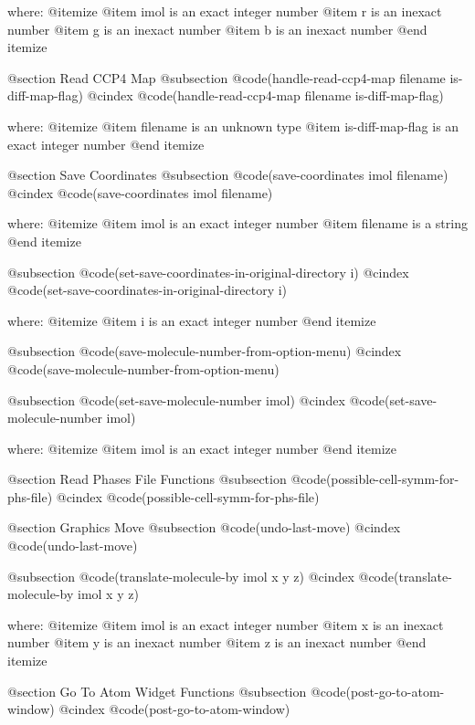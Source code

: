 where: 
 @itemize 
     @item imol is an exact integer number
     @item r is an inexact number
     @item g is an inexact number
     @item b is an inexact number
 @end itemize



@section Read CCP4 Map 
@subsection @code{(handle-read-ccp4-map filename is-diff-map-flag)}
@cindex @code{(handle-read-ccp4-map filename is-diff-map-flag)}
 
where: 
 @itemize 
     @item filename is an unknown type
     @item is-diff-map-flag is an exact integer number
 @end itemize



@section Save Coordinates 
@subsection @code{(save-coordinates imol filename)}
@cindex @code{(save-coordinates imol filename)}
 
where: 
 @itemize 
     @item imol is an exact integer number
     @item filename is a string
 @end itemize


@subsection @code{(set-save-coordinates-in-original-directory i)}
@cindex @code{(set-save-coordinates-in-original-directory i)}
 
where: 
 @itemize 
     @item i is an exact integer number
 @end itemize


@subsection @code{(save-molecule-number-from-option-menu)}
@cindex @code{(save-molecule-number-from-option-menu)}
 
@subsection @code{(set-save-molecule-number imol)}
@cindex @code{(set-save-molecule-number imol)}
 
where: 
 @itemize 
     @item imol is an exact integer number
 @end itemize



@section Read Phases File Functions 
@subsection @code{(possible-cell-symm-for-phs-file)}
@cindex @code{(possible-cell-symm-for-phs-file)}
 

@section Graphics Move 
@subsection @code{(undo-last-move)}
@cindex @code{(undo-last-move)}
 
@subsection @code{(translate-molecule-by imol x y z)}
@cindex @code{(translate-molecule-by imol x y z)}
 
where: 
 @itemize 
     @item imol is an exact integer number
     @item x is an inexact number
     @item y is an inexact number
     @item z is an inexact number
 @end itemize



@section Go To Atom Widget Functions 
@subsection @code{(post-go-to-atom-window)}
@cindex @code{(post-go-to-atom-window)}
 
